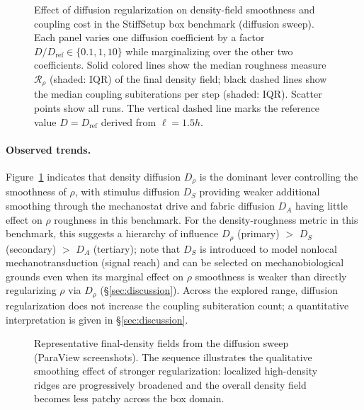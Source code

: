 \begin{figure}[htbp]
  \centering
  \caption{Effect of diffusion regularization on density-field smoothness and coupling cost in the StiffSetup box benchmark (diffusion sweep).
  Each panel varies one diffusion coefficient by a factor $D/D_{\mathrm{ref}}\in\{0.1,1,10\}$ while marginalizing over the other two coefficients.
  Solid colored lines show the median roughness measure $\mathcal{R}_\rho$ (shaded: IQR) of the final density field; black dashed lines show the median coupling subiterations per step (shaded: IQR).
  Scatter points show all runs. The vertical dashed line marks the reference value $D=D_{\mathrm{ref}}$ derived from $\ell=1.5h$.}
  \label{fig:diffusion_diagnostic}
\end{figure}

\paragraph{Observed trends.}
Figure~\ref{fig:diffusion_diagnostic} indicates that density diffusion $D_\rho$ is the dominant lever controlling the smoothness of $\rho$, with stimulus diffusion $D_S$ providing weaker additional smoothing through the mechanostat drive and fabric diffusion $D_A$ having little effect on $\rho$ roughness in this benchmark.
For the density-roughness metric in this benchmark, this suggests a hierarchy of influence $D_\rho$ (primary) $>$ $D_S$ (secondary) $>$ $D_A$ (tertiary); note that $D_S$ is introduced to model nonlocal mechanotransduction (signal reach) and can be selected on mechanobiological grounds even when its marginal effect on $\rho$ smoothness is weaker than directly regularizing $\rho$ via $D_\rho$ (\S\ref{sec:discussion}).
Across the explored range, diffusion regularization does not increase the coupling subiteration count; a quantitative interpretation is given in \S\ref{sec:discussion}.

\begin{figure}[htbp]
  \centering
  \caption{Representative final-density fields from the diffusion sweep (ParaView screenshots).
  The sequence illustrates the qualitative smoothing effect of stronger regularization: localized high-density ridges are progressively broadened and the overall density field becomes less patchy across the box domain.}
  \label{fig:diffusion_effects}
\end{figure}
